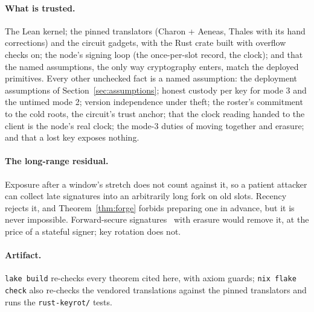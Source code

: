 \documentclass[10pt]{article}
\DeclareRobustCommand{\code}[1]{{\renewcommand{\_}{\textunderscore\allowbreak}\texttt{#1}}}
\begin{document}
\paragraph{What is trusted.} The Lean kernel; the pinned translators
(Charon + Aeneas, Thales with its hand corrections) and the circuit
gadgets, with the Rust crate built with overflow checks on; the node's
signing loop (the once-per-slot record, the clock); and that the named
assumptions, the only way cryptography enters, match the deployed
primitives. Every other unchecked fact is a named assumption: the
deployment assumptions of Section~\ref{sec:assumptions}; honest custody per key for mode 3 and the untimed
mode 2; version independence under theft; the roster's commitment to the
cold roots, the circuit's trust anchor; that the clock reading handed
to the client is the node's real clock; the mode-3 duties of moving together and erasure; and that a lost key
exposes nothing.

\paragraph{The long-range residual.} Exposure after a window's stretch
does not count against it, so a patient attacker can collect late
signatures into an arbitrarily long fork on old slots. Recency rejects
it, and Theorem~\ref{thm:forge} forbids preparing one in advance, but it
is never impossible. Forward-secure signatures~\cite{forwardsec}
with erasure would remove it, at the price of a stateful signer; key
rotation does not.

\paragraph{Artifact.} \code{lake build} re-checks every theorem cited
here, with axiom guards; \code{nix flake check} also re-checks the vendored translations against
the pinned translators and runs the \code{rust-keyrot/} tests.
\end{document}
